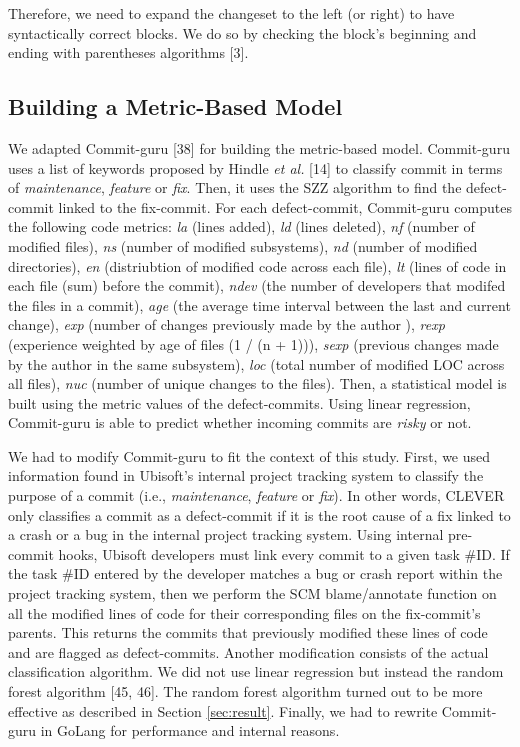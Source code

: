\documentclass[sigconf]{acmart}
\begin{document}
Therefore, we need to expand the changeset to the left (or right) to
have syntactically correct blocks. We do so by checking the block's
beginning and ending with parentheses algorithms [3].





\subsection{Building a Metric-Based Model}\label{sec:metric-based}

We adapted Commit-guru [38] for building the metric-based model.
Commit-guru uses a list of keywords proposed by Hindle \emph{et al.}
[14] to classify commit in terms of \emph{maintenance},
\emph{feature} or \emph{fix}. Then, it uses the SZZ algorithm to find
the defect-commit linked to the fix-commit. For each defect-commit,
Commit-guru computes the following code metrics: \emph{la} (lines
added), \emph{ld} (lines deleted), \emph{nf} (number of modified files),
\emph{ns} (number of modified subsystems), \emph{nd} (number of modified
directories), \emph{en} (distriubtion of modified code across each
file), \emph{lt} (lines of code in each file (sum) before the commit),
\emph{ndev} (the number of developers that modifed the files in a
commit), \emph{age} (the average time interval between the last and
current change), \emph{exp} (number of changes previously made by the
author ), \emph{rexp} (experience weighted by age of files (1 / (n +
1))), \emph{sexp} (previous changes made by the author in the same
subsystem), \emph{loc} (total number of modified LOC across all files),
\emph{nuc} (number of unique changes to the files). Then, a statistical
model is built using the metric values of the defect-commits. Using
linear regression, Commit-guru is able to predict whether incoming
commits are \emph{risky} or not.

We had to modify Commit-guru to fit the context of this study. First, we
used information found in Ubisoft's internal project tracking system to
classify the purpose of a commit (i.e., \emph{maintenance},
\emph{feature} or \emph{fix}). In other words, CLEVER only classifies a
commit as a defect-commit if it is the root cause of a fix linked to a
crash or a bug in the internal project tracking system. Using internal
pre-commit hooks, Ubisoft developers must link every commit to a given
task \#ID. If the task \#ID entered by the developer matches a bug or
crash report within the project tracking system, then we perform the SCM
blame/annotate function on all the modified lines of code for their
corresponding files on the fix-commit's parents. This returns the
commits that previously modified these lines of code and are flagged as
defect-commits. Another modification consists of the actual
classification algorithm. We did not use linear regression but instead
the random forest algorithm [45, 46]. The random forest algorithm
turned out to be more effective as described in Section
\ref{sec:result}. Finally, we had to rewrite Commit-guru in GoLang for
performance and internal reasons.
\end{document}
